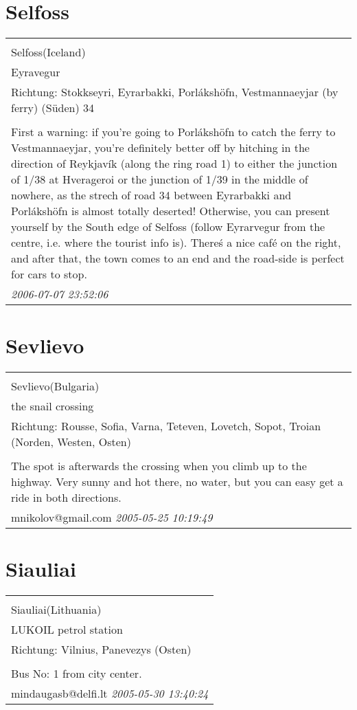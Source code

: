 \documentclass[a4paper,12pt]{article}
\begin{document}
\section{Selfoss}
\begin{tabular}{|p{13cm}|}
\hline\\
Selfoss(Iceland)\\
Eyravegur\\
Richtung: Stokkseyri, Eyrarbakki, Porlákshöfn, Vestmannaeyjar (by ferry) (Süden) 34 \\
\hline\\
First a warning: if you're going to Porlákshöfn to catch the ferry to Vestmannaeyjar, you're definitely better off by hitching in the direction of Reykjavík (along the ring road 1) to either the junction of 1/38 at Hverageroi or the junction of 1/39 in the middle of nowhere, as the strech of road 34 between Eyrarbakki and Porlákshöfn is almost totally deserted!
Otherwise, you can present yourself by the South edge of Selfoss (follow Eyrarvegur from the centre, i.e. where the tourist info is). There\'s a nice café on the right, and after that, the town comes to an end and the road-side is perfect for cars to stop. \\
\textit{ 2006-07-07 23:52:06 }\\\hline
\end{tabular}


\section{Sevlievo}
\begin{tabular}{|p{13cm}|}
\hline\\
Sevlievo(Bulgaria)\\
the snail crossing\\
Richtung: Rousse, Sofia, Varna, Teteven, Lovetch, Sopot, Troian (Norden, Westen, Osten) \\
\hline\\
The spot is afterwards the crossing when you climb up to the highway. Very sunny and hot there, no water, but you can easy get a ride in both directions. \\
mnikolov@gmail.com \textit{ 2005-05-25 10:19:49 }\\\hline
\end{tabular}


\section{Siauliai}
\begin{tabular}{|p{13cm}|}
\hline\\
Siauliai(Lithuania)\\
LUKOIL petrol station\\
Richtung: Vilnius, Panevezys (Osten) \\
\hline\\
Bus No: 1 from city center. \\
mindaugasb@delfi.lt \textit{ 2005-05-30 13:40:24 }\\\hline
\end{tabular}
\end{document}
